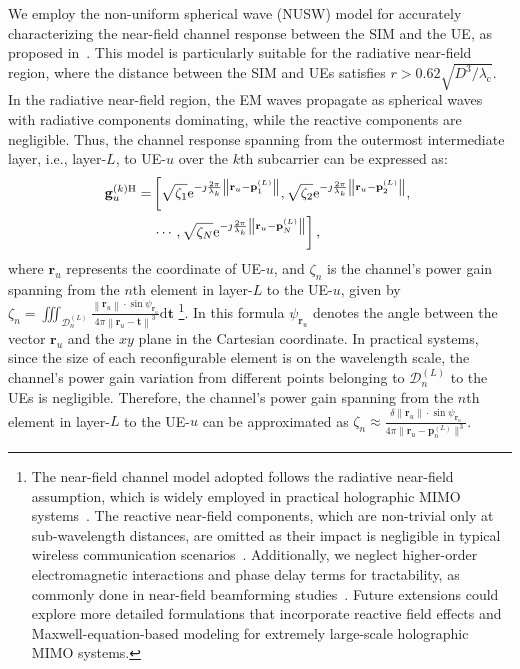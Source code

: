 \documentclass[lettersize,journal]{IEEEtran}
\theoremstyle{remark}
\begin{document}
We employ the non-uniform spherical wave (NUSW) model for accurately characterizing the near-field channel response between the SIM and the UE, as proposed in~\cite{lu2021communicating}. This model is particularly suitable for the radiative near-field region, where the distance between the SIM and UEs satisfies $r>0.62\sqrt{D^3/\lambda_\mathrm{c}}$. In the radiative near-field region, the EM waves propagate as spherical waves with radiative components dominating, while the reactive components are negligible. Thus, the channel response spanning from the outermost intermediate layer, i.e., layer-$L$, to UE-$u$ over the $k$th subcarrier can be expressed as:
\begin{align}\label{System_Model_8}
    \notag\mathbf{g}_u^{(k)\mathrm{H}}=&\left[
    \sqrt{\zeta_{1}}\mathrm{e}^{-\jmath\frac{2\pi}{\lambda_k}
    \left\|\mathbf{r}_u-\mathbf{p}_{1}^{(L)}\right\|},
    \sqrt{\zeta_{2}}\mathrm{e}^{-\jmath\frac{2\pi}{\lambda_k}
    \left\|\mathbf{r}_u-\mathbf{p}_{2}^{(L)}\right\|},\right.\\
    &\left.\cdots,\sqrt{\zeta_{N}}\mathrm{e}^{-\jmath\frac{2\pi}{\lambda_k}
    \left\|\mathbf{r}_u-\mathbf{p}_{N}^{(L)}\right\|}
    \right],
\end{align}
where $\mathbf{r}_u$ represents the coordinate of UE-$u$, and $\zeta_{n}$ is the channel's power gain spanning from the $n$th element in layer-$L$ to the UE-$u$, given by $\zeta_{n}=\iiint_{\mathcal{D}_{n}^{(L)}}\frac{\left\|\mathbf{r}_u\right\|
\cdot\sin\psi_{\mathbf{r}_u}}{4\pi\left\|\mathbf{r}_u-\mathbf{t}\right\|^3}\mathrm{d}\mathbf{t}$
\footnote{The near-field channel model adopted follows the radiative near-field assumption, which is widely employed in practical holographic MIMO systems~\cite{lu2021communicating}. The reactive near-field components, which are non-trivial only at sub-wavelength distances, are omitted as their impact is negligible in typical wireless communication scenarios~\cite{an2023toward_beamfocusing}. Additionally, we neglect higher-order electromagnetic interactions and phase delay terms for tractability, as commonly done in near-field beamforming studies~\cite{lu2021communicating}. Future extensions could explore more detailed formulations that incorporate reactive field effects and Maxwell-equation-based modeling for extremely large-scale holographic MIMO systems.}. In this formula $\psi_{\mathbf{r}_u}$ denotes the angle between the vector $\mathbf{r}_u$ and the $xy$ plane in the Cartesian coordinate. In practical systems, since the size of each reconfigurable element is on the wavelength scale, the channel's power gain variation from different points belonging to $\mathcal{D}_{n}^{(L)}$ to the UEs is negligible. Therefore, the channel's power gain spanning from the $n$th element in layer-$L$ to the UE-$u$ can be approximated as $\zeta_{n}\approx\frac{\delta\|\mathbf{r}_u\|\cdot\sin\psi_{\mathbf{r}_u}}
{4\pi\|\mathbf{r}_u-\mathbf{p}_n^{(L)}\|^3}$.
\end{document}
